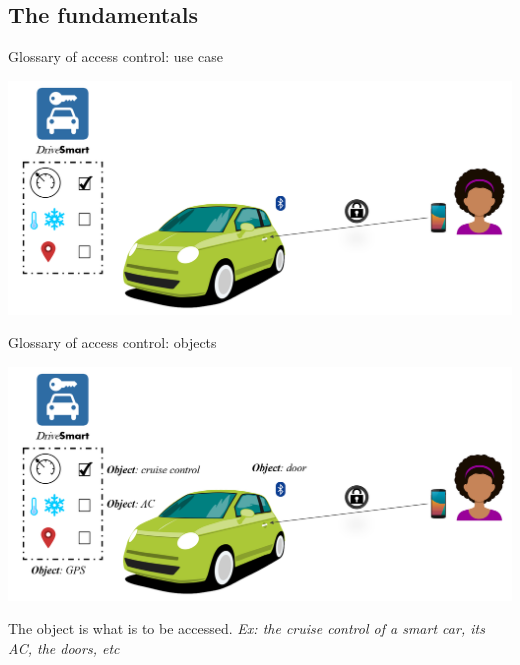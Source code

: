 \subsection{The fundamentals}

\begin{frame}{Glossary of access control: use case}
    \begin{center}
        \includegraphics[scale=0.33]{Figures/ex_intro_1.png}
    \end{center}
\end{frame}

\begin{frame}{Glossary of access control: objects}
    \begin{center}
        \includegraphics[scale=0.33]{Figures/ex_intro_2.png}
    \end{center}
    
    \begin{definition}
        The \alert{object} is what is to be accessed. 
            \newline \emph{Ex: the cruise control of a smart car, its AC, the doors, etc}
    \end{definition}
\end{frame}

